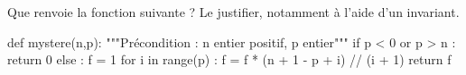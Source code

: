Que renvoie la fonction suivante ? Le justifier, notamment à l'aide d'un invariant. 
\begin{pyverbatim}%
def mystere(n,p):
    """Précondition : n entier positif, p entier"""
    if p < 0 or p > n : 
        return 0
    else : 
        f = 1
        for i in range(p) : 
            f = f * (n + 1 - p + i) // (i + 1)
        return f
\end{pyverbatim}
